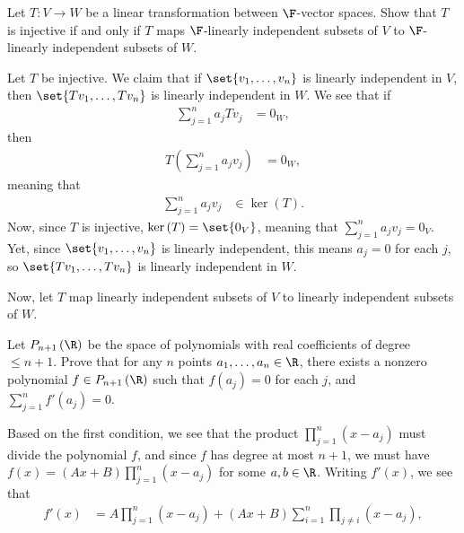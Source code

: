 \documentclass[10pt]{mypackage}
\begin{document}
\RaggedRight
\begin{problem}[Problem 1]
  Let $T\colon V\rightarrow W$ be a linear transformation between $\F$-vector spaces. Show that $T$ is injective if and only if $T$ maps $\F$-linearly independent subsets of $V$ to $\F$-linearly independent subsets of $W$.
\end{problem}
\begin{solution}
  Let $T$ be injective. We claim that if $\set{v_1,\dots,v_n}$ is linearly independent in $V$, then $\set{Tv_1,\dots,Tv_n}$ is linearly independent in $W$. We see that if
  \begin{align*}
    \sum_{j=1}^{n}a_jTv_j &= 0_{W},
  \end{align*}
  then
  \begin{align*}
    T\left( \sum_{j=1}^{n}a_jv_j \right) &= 0_W,
  \end{align*}
  meaning that
  \begin{align*}
    \sum_{j=1}^{n}a_jv_j &\in \ker\left( T \right).
  \end{align*}
  Now, since $T$ is injective, $\ker\left( T \right) = \set{0_V}$, meaning that $\sum_{j=1}^{n}a_jv_j = 0_V$. Yet, since $\set{v_1,\dots,v_n}$ is linearly independent, this means $a_j = 0$ for each $j$, so $\set{Tv_1,\dots,Tv_n}$ is linearly independent in $W$.\newline

  Now, let $T$ map linearly independent subsets of $V$ to linearly independent subsets of $W$. 
\end{solution}
\begin{problem}[Problem 2]
  Let $P_{n+1}\left( \R \right)$ be the space of polynomials with real coefficients of degree $\leq n+1$. Prove that for any $n$ points $a_1,\dots,a_n\in \R$, there exists a nonzero polynomial $f\in P_{n+1}\left( \R \right)$ such that $f\left( a_j \right) = 0$ for each $j$, and $\sum_{j=1}^{n}f'\left(a_j\right) = 0$.
\end{problem}
\begin{solution}
  Based on the first condition, we see that the product $\prod_{j=1}^{n}\left( x-a_j \right)$ must divide the polynomial $f$, and since $f$ has degree at most $n+1$, we must have $f(x) = \left( Ax+B \right)\prod_{j=1}^{n} \left( x-a_j \right)$ for some $a,b\in \R$. Writing $f'(x)$, we see that
  \begin{align*}
    f'(x) &= A\prod_{j=1}^{n}\left( x-a_j \right) + \left( Ax+B \right)\sum_{i=1}^{n} \prod_{j\neq i}\left( x-a_j \right),
  \end{align*}
\end{solution}
\end{document}
